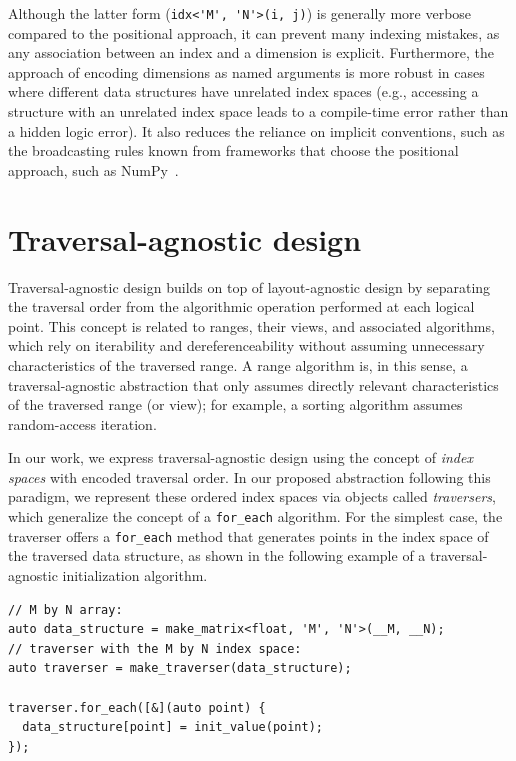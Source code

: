Although the latter form (\lstinline{idx<'M', 'N'>(i, j)}) is generally more verbose compared to the positional approach, it can prevent many indexing mistakes, as any association between an index and a dimension is explicit. Furthermore, the approach of encoding dimensions as named arguments is more robust in cases where different data structures have unrelated index spaces (e.g., accessing a structure with an unrelated index space leads to a compile-time error rather than a hidden logic error). It also reduces the reliance on implicit conventions, such as the broadcasting rules known from frameworks that choose the positional approach, such as NumPy~\cite{harris2020array}.

\section{Traversal-agnostic design}\label{sec:traversal-agnostic-design}

Traversal-agnostic design builds on top of layout-agnostic design by separating the traversal order from the algorithmic operation performed at each logical point. This concept is related to \cpp ranges, their views, and associated algorithms, which rely on iterability and dereferenceability without assuming unnecessary characteristics of the traversed range. A range algorithm is, in this sense, a traversal-agnostic abstraction that only assumes directly relevant characteristics of the traversed range (or view); for example, a sorting algorithm assumes random-access iteration.

In our work, we express traversal-agnostic design using the concept of \emph{index spaces} with encoded traversal order. In our proposed abstraction following this paradigm, we represent these ordered index spaces via objects called \emph{traversers}, which generalize the concept of a \texttt{for\_each} algorithm. For the simplest case, the traverser offers a \lstinline{for_each} method that generates points in the index space of the traversed data structure, as shown in the following example of a traversal-agnostic initialization algorithm.

\begin{lstlisting}[style=C++, caption={A traversal-agnostic initialization algorithm}, label={lst:traversal-agnostic-initialization}]
// M by N array:
auto data_structure = make_matrix<float, 'M', 'N'>(__M, __N);
// traverser with the M by N index space:
auto traverser = make_traverser(data_structure);

traverser.for_each([&](auto point) {
  data_structure[point] = init_value(point);
});
\end{lstlisting}

